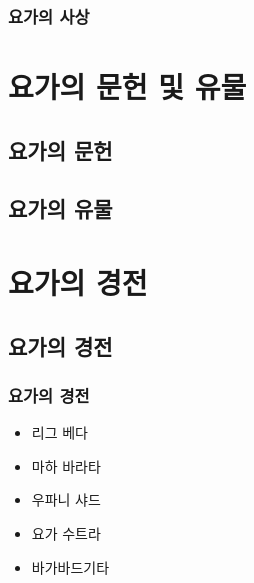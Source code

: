 \documentclass[12pt, a4paper, oneside]{book}
\let\stdsection\section
\renewcommand\section{\newpage\stdsection}
\begin{document}
\subsection{요가의 사상}





%
%
%
\chapter{요가의 문헌 및 유물}
\minitoc%


\section{요가의 문헌}



\section{요가의 유물}


%
%
%
\chapter{요가의 경전}
\minitoc%

\section{요가의 경전}

\subsection{요가의 경전}




			\begin{itemize}[topsep=0.0em, parsep=0.0em, itemsep=0em, leftmargin=12.0em, labelwidth=3em, labelsep=3em] 
			\item 리그 베다
			\item 마하 바라타
			\item 우파니 샤드
			\item 요가 수트라
			\item 바가바드기타
			\end{itemize}
\end{document}
